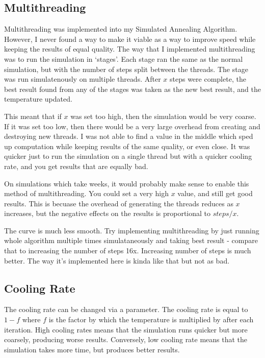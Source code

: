 \documentclass[a4paper, 11pt,table]{article}
\begin{document}
	\subsection{Multithreading}
	Multithreading was implemented into my Simulated Annealing Algorithm. However, I never found a way to make it viable as a way to improve speed while keeping the results of equal quality. The way that I implemented multithreading was to run the simulation in `stages'. Each stage ran the same as the normal simulation, but with the number of steps split between the threads. The stage was run simulatenously on multiple threads. After $x$ steps were complete, the best result found from any of the stages was taken as the new best result, and the temperature updated.
	
	This meant that if $x$ was set too high, then the simulation would be very coarse. If it was set too low, then there would be a very large overhead from creating and destroying new threads. I was not able to find a value in the middle which sped up computation while keeping results of the same quality, or even close. It was quicker just to run the simulation on a single thread but with a quicker cooling rate, and you get results that are equally bad.
	
	On simulations which take weeks, it would probably make sense to enable this method of multithreading. You could set a very high $x$ value, and still get good results. This is becuase the overhead of generating the threads reduces as $x$ increases, but the negative effects on the results is proportional to $steps/x$.
	
	The curve is much less smooth. Try implementing multithreading by just running whole algorithm multiple times simulataneously and taking best result - compare that to increasing the number of steps 16x. Increasing number of steps is much better. The way it's implemented here is kinda like that but not as bad.
	
	\subsection{Cooling Rate}
	The cooling rate can be changed via a parameter. The cooling rate is equal to $1-f$ where $f$ is the factor by which the temperature is multiplied by after each iteration. High cooling rates means that the simulation runs quicker but more coarsely, producing worse results. Conversely, low cooling rate means that the simulation takes more time, but produces better results.
	
\end{document}
